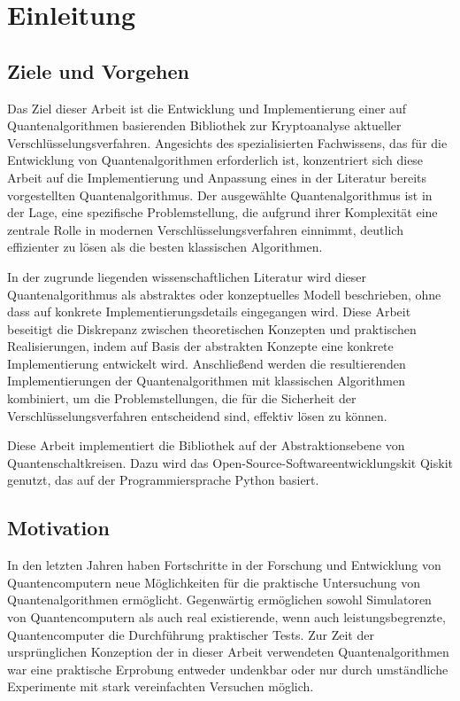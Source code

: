 \section{Einleitung}

\subsection{Ziele und Vorgehen}
Das Ziel dieser Arbeit ist die Entwicklung und Implementierung einer auf Quantenalgorithmen 
basierenden Bibliothek zur Kryptoanalyse aktueller Verschlüsselungsverfahren. 
Angesichts des spezialisierten Fachwissens, das für die Entwicklung von Quantenalgorithmen erforderlich ist, 
konzentriert sich diese Arbeit auf die Implementierung und Anpassung eines in der Literatur bereits vorgestellten Quantenalgorithmus.
Der ausgewählte Quantenalgorithmus ist in der Lage, eine spezifische Problemstellung, 
die aufgrund ihrer Komplexität eine zentrale Rolle in modernen Verschlüsselungsverfahren einnimmt, 
deutlich effizienter zu lösen als die besten klassischen Algorithmen.

In der zugrunde liegenden wissenschaftlichen Literatur wird dieser Quantenalgorithmus als abstraktes oder konzeptuelles Modell beschrieben, 
ohne dass auf konkrete Implementierungsdetails eingegangen wird. 
Diese Arbeit beseitigt die Diskrepanz zwischen theoretischen Konzepten und praktischen Realisierungen, 
indem auf Basis der abstrakten Konzepte eine konkrete Implementierung entwickelt wird.
Anschließend werden die resultierenden Implementierungen der Quantenalgorithmen mit klassischen Algorithmen kombiniert, 
um die Problemstellungen, die für die Sicherheit der Verschlüsselungsverfahren entscheidend sind, effektiv lösen zu können. 

Diese Arbeit implementiert die Bibliothek auf der Abstraktionsebene von Quantenschaltkreisen.
Dazu wird das Open-Source-Softwareentwicklungskit Qiskit genutzt, das auf der Programmiersprache Python basiert.

\subsection{Motivation}
In den letzten Jahren haben Fortschritte in der Forschung und Entwicklung von Quantencomputern neue Möglichkeiten für die praktische Untersuchung von Quantenalgorithmen ermöglicht.
Gegenwärtig ermöglichen sowohl Simulatoren von Quantencomputern als auch real existierende, wenn auch leistungsbegrenzte, Quantencomputer die Durchführung praktischer Tests.
Zur Zeit der ursprünglichen Konzeption der in dieser Arbeit verwendeten Quantenalgorithmen war eine praktische Erprobung entweder undenkbar oder nur durch umständliche Experimente mit stark vereinfachten Versuchen möglich.

